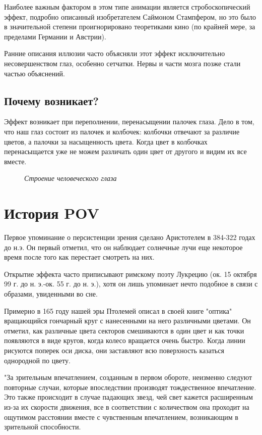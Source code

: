 \documentclass[a4paper, 12pt]{article}
\newcommand{\image}[3]{
	\begin{figure}[ht]
		\center{\texttt{[image: img/\#1]} }
		\caption{\textit{#3}}\end{figure}
}
\begin{document}
Наиболее важным фактором в этом типе анимации является стробоскопический эффект,
подробно описанный изобретателем Саймоном Стампфером, но это было в значительной
степени проигнорировано теоретиками кино (по крайней мере, за пределами Германии и Австрии).


Ранние описания иллюзии часто объясняли этот эффект исключительно несовершенством
глаз, особенно сетчатки. Нервы и части мозга позже стали частью объяснений.
\subsection{Почему возникает?}

Эффект возникает при переполнении, перенасыщении палочек глаза.
Дело в том, что наш глаз состоит из палочек и колбочек: колбочки отвечают
за различие цветов, а палочки за насыщенность цвета. Когда цвет в
колбочках перенасыщается уже не можем различать один цвет от другого и
видим их все вместе.

\image{глаз.png}{340}{Строение человеческого глаза}

\newpage

\section{История POV}

Первое упоминание о персистенции зрения сделано Аристотелем
в 384-322 годах до н.э. Он первый отметил, что он наблюдает
солнечные лучи еще некоторое время после того как перестает
смотреть на них.

Открытие эффекта часто приписывают римскому поэту Лукрецию
(ок. 15 октября 99 г. до н. э.-ок. 55 г. до н. э.), хотя он лишь упоминает
нечто подобное в связи с образами, увиденными во сне.

Примерно в 165 году нашей эры Птолемей описал в своей книге
"оптика" вращающийся гончарный круг с нанесенными на него
различными цветами. Он отметил, как различные цвета секторов
смешиваются в один цвет и как точки появляются в виде кругов, когда
колесо вращается очень быстро. Когда линии рисуются поперек оси
диска, они заставляют всю поверхность казаться однородной по цвету.

"За зрительным впечатлением, созданным в первом обороте, неизменно
следуют повторные случаи, которые впоследствии производят
тождественное впечатление. Это также происходит в случае падающих
звезд, чей свет кажется расширенным из-за их скорости движения, все
в соответствии с количеством она проходит на ощутимом расстоянии
вместе с чувственным впечатлением, возникающим в зрительной
способности.
\end{document}
